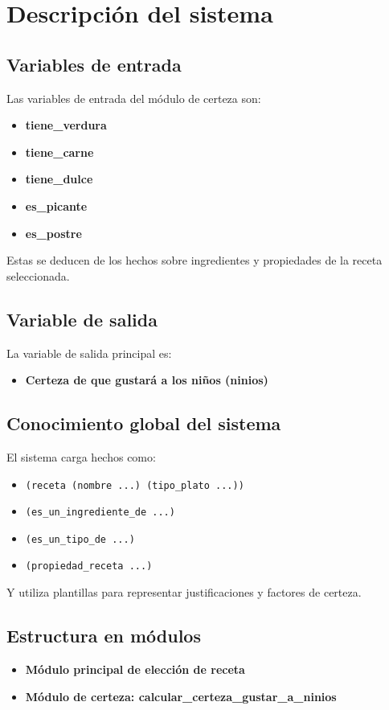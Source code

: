 \documentclass[a4paper,12pt]{article}
\begin{document}
\section{Descripción del sistema}

\subsection{Variables de entrada}
Las variables de entrada del módulo de certeza son:
\begin{itemize}
  \item \textbf{tiene\_verdura}
  \item \textbf{tiene\_carne}
  \item \textbf{tiene\_dulce}
  \item \textbf{es\_picante}
  \item \textbf{es\_postre}
\end{itemize}

Estas se deducen de los hechos sobre ingredientes y propiedades de la receta seleccionada.

\subsection{Variable de salida}
La variable de salida principal es:
\begin{itemize}
  \item \textbf{Certeza de que gustará a los niños (ninios)}
\end{itemize}

\subsection{Conocimiento global del sistema}
El sistema carga hechos como:
\begin{itemize}
  \item \texttt{(receta (nombre ...) (tipo\_plato ...))}
  \item \texttt{(es\_un\_ingrediente\_de ...)}
  \item \texttt{(es\_un\_tipo\_de ...)}
  \item \texttt{(propiedad\_receta ...)}
\end{itemize}

Y utiliza plantillas para representar justificaciones y factores de certeza.

\subsection{Estructura en módulos}
\begin{itemize}
  \item \textbf{Módulo principal de elección de receta}
  \item \textbf{Módulo de certeza: calcular\_certeza\_gustar\_a\_ninios}
\end{itemize}
\end{document}
